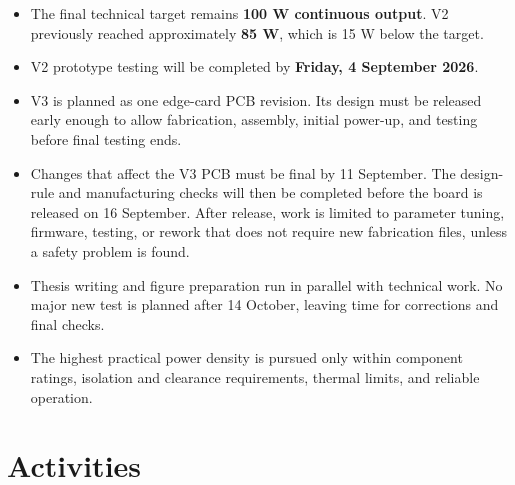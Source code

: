 \documentclass[12pt,a4paper]{report}
\begin{document}
\begin{itemize}
    \item The final technical target remains \textbf{100 W continuous output}. V2 previously reached approximately \textbf{85 W}, which is 15 W below the target.
    \item V2 prototype testing will be completed by \textbf{Friday, 4 September 2026}.
    \item V3 is planned as one edge-card PCB revision. Its design must be released early enough to allow fabrication, assembly, initial power-up, and testing before final testing ends.
    \item Changes that affect the V3 PCB must be final by 11 September. The design-rule and manufacturing checks will then be completed before the board is released on 16 September. After release, work is limited to parameter tuning, firmware, testing, or rework that does not require new fabrication files, unless a safety problem is found.
    \item Thesis writing and figure preparation run in parallel with technical work. No major new test is planned after 14 October, leaving time for corrections and final checks.
    \item The highest practical power density is pursued only within component ratings, isolation and clearance requirements, thermal limits, and reliable operation.
\end{itemize}

\clearpage
\section{Activities}
\end{document}
